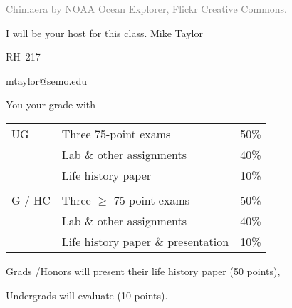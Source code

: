 \documentclass[t,handout]{beamer}  %
\begin{document}


{
\begin{frame}[b,plain]
	\hfill\tiny\textcolor{gray}{Chimaera by NOAA Ocean Explorer, Flickr Creative Commons.}
\end{frame}
}

{
\begin{frame}[t,plain]{I will be your host for this class.}
	\vspace{5ex}
	\hangpara\hspace{17em} Mike Taylor

	\hangpara\hspace{17em} RH~217

	\hangpara\hspace{17em} mtaylor@semo.edu

\end{frame}
}

\begin{frame}[t]{You  your grade with}
	\begin{center}\large\begin{tabular}{@{}lll@{}}
	UG		&	Three 75-point exams 				& 	50\% \\
			&	Lab \& other assignments 			& 	40\% \\
			&	Life history paper 					& 	10\% \\
			&										&	\\
	G / HC	&	Three $\geq$ 75-point exams 		& 	50\% \\
			&	Lab \& other assignments 			& 	40\% \\
			&	Life history paper \& presentation 	&	10\% \\
	\end{tabular}
	\end{center}

	\vspace{1.5\baselineskip}

	\hspace{2em} Grads /Honors will present their life history paper (50 points),
	
	\vspace{\baselineskip}
	
	\hspace{2em} Undergrads will evaluate (10 points).

\end{frame}
\end{document}
